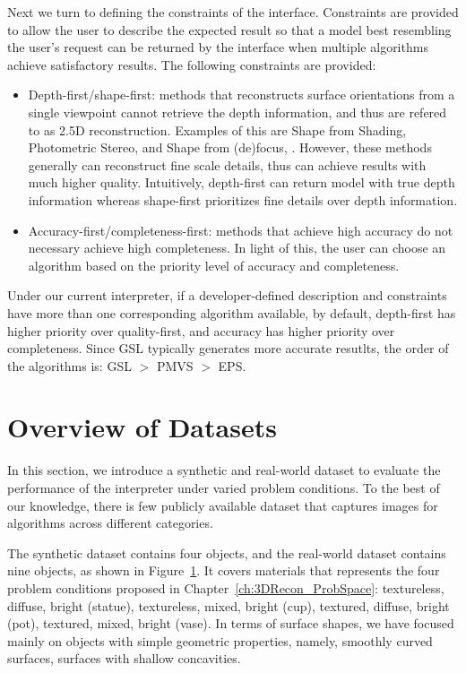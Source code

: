 Next we turn to defining the constraints of the interface. Constraints are provided to allow the user to describe the expected result so that a model best resembling the user's request can be returned by the interface when multiple algorithms achieve satisfactory results. The following constraints are provided: 
\begin{itemize}
\item Depth-first/shape-first: methods that reconstructs surface orientations from a single viewpoint cannot retrieve the depth information, and thus are refered to as 2.5D reconstruction. Examples of this are Shape from Shading, Photometric Stereo, and Shape from (de)focus, \etc. However, these methods generally can reconstruct fine scale details, thus can achieve results with much higher quality. Intuitively, depth-first can return model with true depth information whereas shape-first prioritizes fine details over depth information.
\item Accuracy-first/completeness-first: methods that achieve high accuracy do not necessary achieve high completeness. In light of this, the user can choose an algorithm based on the priority level of accuracy and completeness.
\end{itemize}

Under our current interpreter, if a developer-defined description and constraints have more than one corresponding algorithm available, by default, depth-first has higher priority over quality-first, and accuracy has higher priority over completeness. Since GSL typically generates more accurate resutlts, the order of the algorithms is: GSL $>$ PMVS $>$ EPS.

\section{Overview of Datasets}
In this section, we introduce a synthetic and real-world dataset to evaluate the performance of the interpreter under varied problem conditions. To the best of our knowledge, there is few publicly available dataset that captures images for algorithms across different categories.

The synthetic dataset contains four objects, and the real-world dataset contains nine objects, as shown in Figure~\ref{}. It covers materials that represents the four problem conditions proposed in Chapter~\ref{ch:3DRecon_ProbSpace}: textureless, diffuse, bright (statue), textureless, mixed, bright (cup), textured, diffuse, bright (pot), textured, mixed, bright (vase). In terms of surface shapes, we have focused mainly on objects with simple geometric properties, namely, smoothly curved surfaces, surfaces with shallow concavities.

